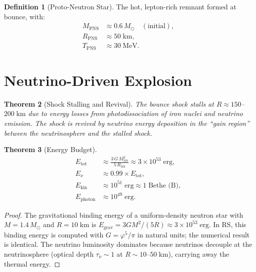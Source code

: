 \documentclass[12pt,a4paper]{article}
\newtheorem{theorem}{Theorem}[section]
\theoremstyle{definition}
\newtheorem{definition}[theorem]{Definition}
\theoremstyle{remark}
\begin{document}
\begin{definition}[Proto-Neutron Star]
The hot, lepton-rich remnant formed at bounce, with:
\begin{align}
  M_{\mathrm{PNS}} &\approx 0.6\,M_\odot
  \quad (\text{initial}), \\
  R_{\mathrm{PNS}} &\approx 50\;\mathrm{km}, \\
  T_{\mathrm{PNS}} &\approx 30\;\mathrm{MeV}.
\end{align}
\end{definition}

\section{Neutrino-Driven Explosion}
\label{sec:neutrinos}

\begin{theorem}[Shock Stalling and Revival]
The bounce shock stalls at $R \approx 150$--$200\;\mathrm{km}$ due
to energy losses from photodissociation of iron nuclei and neutrino
emission.  The shock is revived by neutrino energy deposition in the
``gain region'' between the neutrinosphere and the stalled shock.
\end{theorem}

\begin{theorem}[Energy Budget]
\label{thm:energy}
\begin{align}
  E_{\mathrm{tot}} &\approx \frac{3\,G\,M_{\mathrm{NS}}^2}
  {5\,R_{\mathrm{NS}}} \approx 3 \times
  10^{53}\;\mathrm{erg}, \\
  E_\nu &\approx 0.99 \times E_{\mathrm{tot}}, \\
  E_{\mathrm{kin}} &\approx 10^{51}\;\mathrm{erg}
  \approx 1\;\text{Bethe (B)}, \\
  E_{\mathrm{photon}} &\approx 10^{49}\;\mathrm{erg}.
\end{align}
\end{theorem}

\begin{proof}
The gravitational binding energy of a uniform-density neutron star
with $M = 1.4\,M_\odot$ and $R = 10\;\mathrm{km}$ is
$E_{\mathrm{grav}} = 3GM^2/(5R) \approx 3 \times
10^{53}\;\mathrm{erg}$.  In RS, this binding energy is computed with
$G = \varphi^5/\pi$ in natural units; the numerical result is
identical.  The neutrino luminosity dominates because neutrinos
decouple at the neutrinosphere (optical depth $\tau_\nu \sim 1$ at
$R \sim 10$--$50\;\mathrm{km}$), carrying away the thermal energy.
\end{proof}
\end{document}

